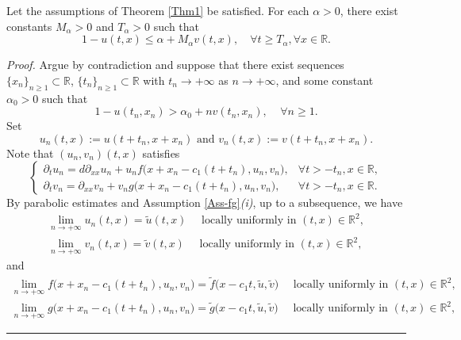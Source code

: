 \documentclass[10pt,a4paper]{amsart}
\newcommand{\R}{\mathbb{R}}
\newenvironment{proof}[1][Proof]{\noindent\textit{#1.} }{\hfill \rule{0.5em}{0.5em}}
\begin{document}
\begin{lemma}\label{Lem-estimate}
Let the assumptions of  Theorem \ref{Thm1} be satisfied.   For each $\alpha>0$, there exist  constants  $M_{\alpha}>0$ and $T_{\alpha} >0$ such that 
\begin{equation*}
1-u(t,x) \leq \alpha+ M_{\alpha} v(t,x), \quad \forall t\geq T_{\alpha}, \forall x\in\R.
\end{equation*}
\end{lemma}

\begin{proof}
Argue by contradiction and suppose that there exist  sequences $\{x_n\}_{n\geq 1} \subset \R $,  $\{t_n\}_{n\geq 1} \subset \R$ with  $t_n \to +\infty$ as $n \to +\infty$,     and some constant  $\alpha_0>0 $  such that 
\begin{equation} \label{contra1}
1-u(t_n, x_n) > \alpha_0 + n  v(t_n, x_n), \;\;\;\; \forall n\geq 1.
\end{equation}
Set
\begin{equation*}
u_n(t,x) := u(t+t_n, x+x_n) \text{ and } v_n(t,x) := v(t+t_n, x+x_n). 
\end{equation*}
Note that $(u_n, v_n) (t,x)$ satisfies 
\begin{equation*}
\begin{cases}
\partial_t u_n= d \partial_{xx} u_n +   u_n f \big( x+x_n -c_1(t+t_n), u_n, v_n \big), & \forall t>-t_n, x\in \R, \\
\partial_t v_n =  \partial_{xx} v_n   + v_n  g\big(  x+x_n -c_1(t+t_n), u_n,   v_n  \big), & \forall t>-t_n, x\in \R.
\end{cases}
\end{equation*}
By parabolic estimates and Assumption \ref{Ass-fg}\textit{(i)}, up to a subsequence, we have 
\begin{align*}
\lim_{n\to +\infty} u_n(t,x) = \tilde{u}(t,x) \quad \text{ locally uniformly in }  (t,x) \in \R^2, \\
\lim_{n\to +\infty} v_n(t,x) = \tilde{v}(t,x) \quad  \text{ locally uniformly in }  (t,x) \in \R^2,
\end{align*}
and 
\begin{align*}
\lim_{n\to +\infty} f \big( x+x_n -c_1(t+t_n), u_n, v_n \big) = \tilde{f} \big( x-c_1t, \tilde{u}, \tilde{v} \big) \quad \text{ locally uniformly in }  (t,x) \in \R^2, \\
\lim_{n\to +\infty} g \big( x+x_n -c_1(t+t_n), u_n, v_n \big) = \tilde{g} \big( x-c_1t, \tilde{u}, \tilde{v} \big) \quad \text{ locally uniformly in }  (t,x) \in \R^2,
\end{align*}

\end{proof}
\end{document}
